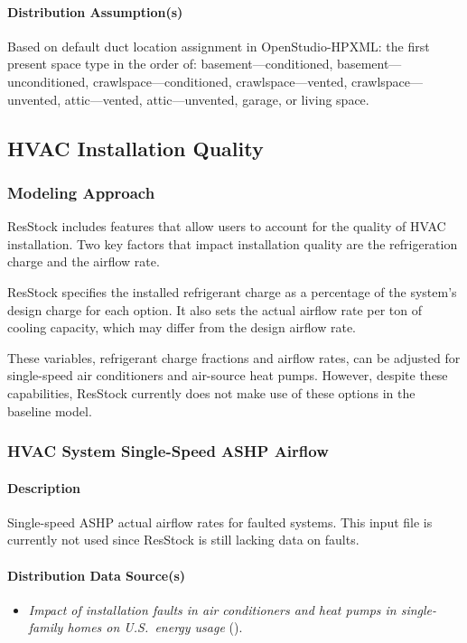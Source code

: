 \paragraph{Distribution Assumption(s)}
Based on default duct location assignment in OpenStudio-HPXML: the first present space type in the order of: basement---conditioned, basement---unconditioned, crawlspace---conditioned, crawlspace---vented, crawlspace---unvented, attic---vented, attic---unvented, garage, or living space. 


\subsection{HVAC Installation Quality}
\subsubsection{Modeling Approach}
ResStock includes features that allow users to account for the quality of HVAC installation. Two key factors that impact installation quality are the refrigeration charge and the airflow rate.

ResStock specifies the installed refrigerant charge as a percentage of the system's design charge for each option. It also sets the actual airflow rate per ton of cooling capacity, which may differ from the design airflow rate.

These variables, refrigerant charge fractions and airflow rates, can be adjusted for single-speed air conditioners and air-source heat pumps. However, despite these capabilities, ResStock currently does not make use of these options in the baseline model.

\subsubsection{HVAC System Single-Speed ASHP Airflow}

\paragraph{Description}
Single-speed ASHP actual airflow rates for faulted systems. This input file is currently not used since ResStock is still lacking data on faults. 
\paragraph{Distribution Data Source(s)}
\begin{itemize}
\item 

\textit{Impact of installation faults in air conditioners and heat pumps in single-family homes on U.S.~energy usage} (\cite{Winkler2020}). 

\end{itemize}

